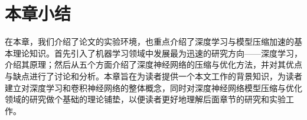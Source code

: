 %
%
%
%
%
%

\section{本章小结}

在本章，我们介绍了论文的实验环境，也重点介绍了深度学习与模型压缩加速的基本理论知识。首先引入了机器学习领域中发展最为迅速的研究方向——深度学习，介绍其原理；然后从五个方面介绍了深度神经网络的压缩与优化方法，并对其优点与缺点进行了讨论和分析。本章旨在为读者提供一个本文工作的背景知识，为读者建立对深度学习和卷积神经网络的整体概念，同时对深度神经网络模型压缩与优化领域的研究做个基础的理论铺垫，以便读者更好地理解后面章节的研究和实验工作。